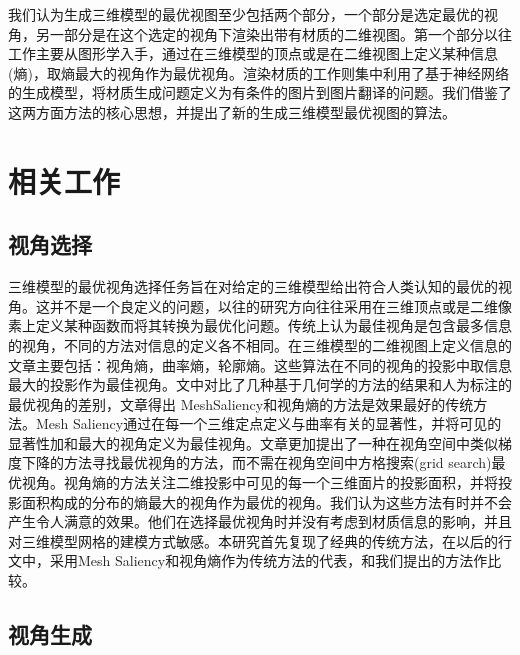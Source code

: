 \documentclass[UTF8,openany,AutoFakeBold,AutoFakeSlant,cs4size]{ctexbook}
\begin{document}
我们认为生成三维模型的最优视图至少包括两个部分，一个部分是选定最优的视角，另一部分是在这个选定的视角下渲染出带有材质的二维视图。第一个部分以往工作主要从图形学入手，通过在三维模型的顶点或是在二维视图上定义某种信息(熵)，取熵最大的视角作为最优视角。渲染材质的工作则集中利用了基于神经网络的生成模型，将材质生成问题定义为有条件的图片到图片翻译的问题。我们借鉴了这两方面方法的核心思想，并提出了新的生成三维模型最优视图的算法。

\section{相关工作}

\subsection{视角选择}

三维模型的最优视角选择任务旨在对给定的三维模型给出符合人类认知的最优的视角。这并不是一个良定义的问题，以往的研究方向往往采用在三维顶点或是二维像素上定义某种函数而将其转换为最优化问题。传统上认为最佳视角是包含最多信息的视角，不同的方法对信息的定义各不相同。在三维模型的二维视图上定义信息的文章主要包括：视角熵\cite{Vzquez2003AutomaticVS}，曲率熵\cite{Page2003ShapeAA}，轮廓熵\cite{Page2003ShapeAA}。这些算法在不同的视角的投影中取信息最大的投影作为最佳视角。\cite{Dutagaci2010ABF}文中对比了几种基于几何学的方法的结果和人为标注的最优视角的差别，文章得出 MeshSaliency\cite{Lee2005MeshS}和视角熵\cite{Vzquez2003AutomaticVS}的方法是效果最好的传统方法。Mesh Saliency\cite{Lee2005MeshS}通过在每一个三维定点定义与曲率有关的显著性，并将可见的显著性加和最大的视角定义为最佳视角。文章更加提出了一种在视角空间中类似梯度下降的方法寻找最优视角的方法，而不需在视角空间中方格搜索(grid search)最优视角。视角熵\cite{Vzquez2003AutomaticVS}的方法关注二维投影中可见的每一个三维面片的投影面积，并将投影面积构成的分布的熵最大的视角作为最优的视角。我们认为这些方法有时并不会产生令人满意的效果。他们在选择最优视角时并没有考虑到材质信息的影响，并且对三维模型网格的建模方式敏感。本研究首先复现了经典的传统方法，在以后的行文中，采用Mesh Saliency和视角熵作为传统方法的代表，和我们提出的方法作比较。

\subsection{视角生成}
\end{document}
